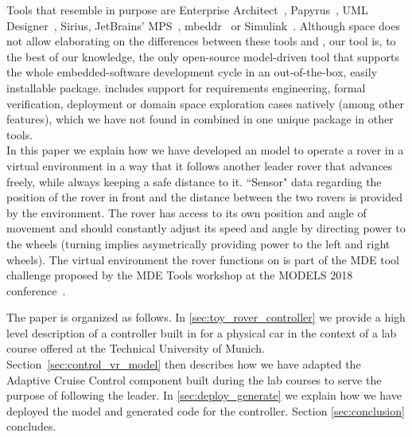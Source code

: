 Tools that resemble \af in purpose are Enterprise Architect~\cite{SparxSystems},
Papyrus~\cite{Papyrus}, UML Designer~\cite{UMLDesigner}, Sirius\cite{Sirius},
JetBrains' MPS~\cite{MPS}, mbeddr~\cite{mbeddr} or Simulink~\cite{simulink}.
Although space does not allow elaborating on the differences between these tools
and \af, our tool is, to the best of our knowledge, the only open-source
model-driven tool that supports the whole embedded-software development cycle in
an out-of-the-box, easily installable package. \af includes support for
requirements engineering, formal verification, deployment or domain space
exploration cases natively (among other features), which we have not found in
combined in one unique package in other tools.\\

In this paper we explain how we have developed an \af model to operate a rover
in a virtual environment in a way that it follows another leader rover that
advances freely, while always keeping a safe distance to it. ``Sensor" data
regarding the position of the rover in front and the distance between the two rovers is
provided by the environment. The rover has access to its own position and angle
of movement and should constantly adjust its speed and angle by directing power
to the wheels (turning implies asymetrically providing power to the left and
right wheels). The virtual environment the rover functions on is part of the MDE
tool challenge proposed by the MDE Tools workshop at the MODELS 2018
conference~\cite{mdetools18}.

The paper is organized as follows. In \sect\ref{sec:toy_rover_controller} we
provide a high level description of a controller built in \af for a physical car in the
context of a lab course offered at the Technical University of Munich.
Section~\ref {sec:control_vr_model} then describes how we have adapted the
Adaptive Cruise Control component built during the lab courses to serve the
purpose of following the leader. In \sect\ref{sec:deploy_generate} we explain
how we have deployed the model and generated \clang code for the controller. Section
\sect\ref{sec:conclusion} concludes.
